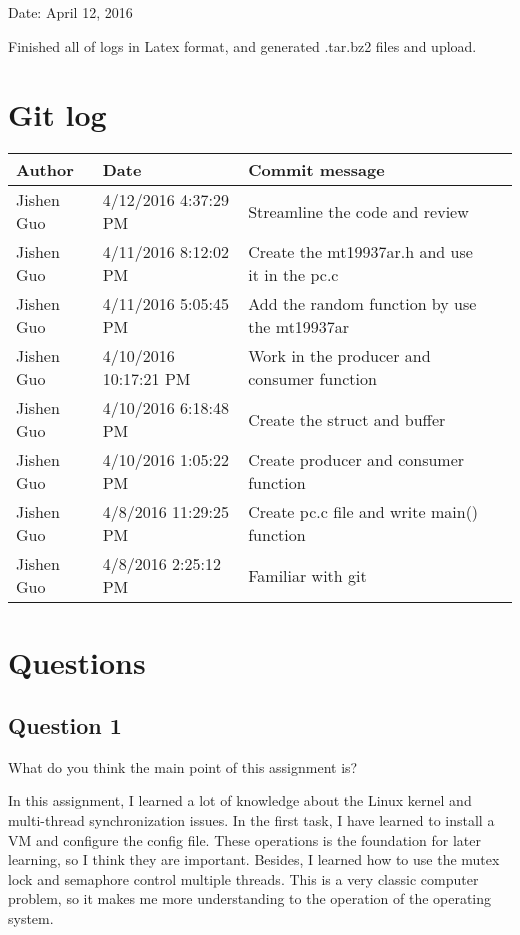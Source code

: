 \documentclass[10pt,draftclsnofoot,peerreview,letterpaper,onecolumn,]{IEEEtran}
\begin{document}
Date: April 12, 2016

Finished all of logs in Latex format, and generated .tar.bz2 files and upload.

\newpage
\section{Git log}

\begin{table}[h]
\centering
\begin{tabular}{|l|l|l|l|}
\hline

Author    & Date & Commit message
\\ \hline
Jishen Guo & 4/12/2016 4:37:29 PM & Streamline the code and review
\\ \hline
Jishen Guo & 4/11/2016 8:12:02 PM & Create the mt19937ar.h and use it in the pc.c
\\ \hline
Jishen Guo & 4/11/2016 5:05:45 PM & Add the random function by use the mt19937ar
\\ \hline
Jishen Guo & 4/10/2016 10:17:21 PM & Work in the producer and consumer function
\\ \hline
Jishen Guo & 4/10/2016 6:18:48 PM & Create the struct and buffer
\\ \hline
Jishen Guo & 4/10/2016 1:05:22 PM & Create producer and consumer function
\\ \hline
Jishen Guo & 4/8/2016 11:29:25 PM & Create pc.c file and write main() function
\\ \hline
Jishen Guo & 4/8/2016 2:25:12 PM & Familiar with git
\\ \hline
\end{tabular}
\end{table}
\newpage

\section{Questions}
\subsection{Question 1}

What do you think the main point of this assignment is?

In this assignment, I learned a lot of knowledge about the Linux kernel and multi-thread synchronization issues. In the first task, I have learned to install a VM and configure the config file. These operations is the foundation for later learning, so I think they are important. Besides, I learned how to use the mutex lock and semaphore control multiple threads. This is a very classic computer problem, so it makes me more understanding to the operation of the operating system.
\end{document}
